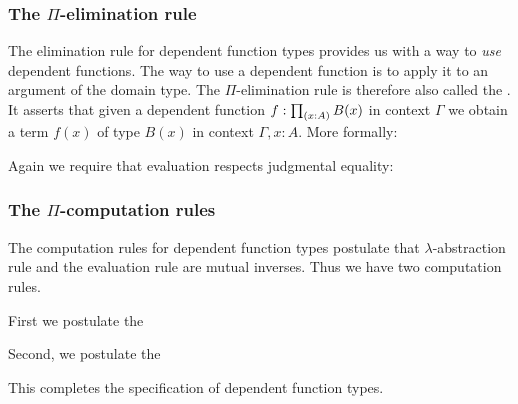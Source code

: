 \subsubsection{The $\Pi$-elimination rule}

The elimination rule for dependent function types provides us with a way to \emph{use} dependent functions. The way to use a dependent function is to apply it to an argument of the domain type. The $\Pi$-elimination rule is therefore also called the . It asserts that given a dependent function $f:\prd{x:A}B(x)$ in context $\Gamma$ we obtain a term $f(x)$ of type $B(x)$ in context $\Gamma,x:A$. More formally:
\begin{prooftree}
\end{prooftree}
Again we require that evaluation respects judgmental equality:
\begin{prooftree}
\end{prooftree}

\subsubsection{The $\Pi$-computation rules}
The computation rules for dependent function types postulate that $\lambda$-abstraction rule and the evaluation rule are mutual inverses. Thus we have two computation rules.

First we postulate the 
\begin{prooftree}
\end{prooftree}
Second, we postulate the 
\begin{prooftree}
\end{prooftree}
This completes the specification of dependent function types.

